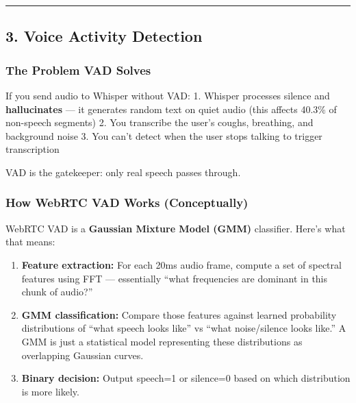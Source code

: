 \documentclass[
  11pt,
]{article}
\begin{document}
\begin{center}\rule{0.5\linewidth}{0.5pt}\end{center}

\hypertarget{voice-activity-detection}{%
\subsection{3. Voice Activity
Detection}\label{voice-activity-detection}}

\hypertarget{the-problem-vad-solves}{%
\subsubsection{The Problem VAD Solves}\label{the-problem-vad-solves}}

If you send audio to Whisper without VAD: 1. Whisper processes silence
and \textbf{hallucinates} --- it generates random text on quiet audio
(this affects 40.3\% of non-speech segments) 2. You transcribe the
user's coughs, breathing, and background noise 3. You can't detect when
the user stops talking to trigger transcription

VAD is the gatekeeper: only real speech passes through.

\hypertarget{how-webrtc-vad-works-conceptually}{%
\subsubsection{How WebRTC VAD Works
(Conceptually)}\label{how-webrtc-vad-works-conceptually}}

WebRTC VAD is a \textbf{Gaussian Mixture Model (GMM)} classifier. Here's
what that means:

\begin{enumerate}
\def\labelenumi{\arabic{enumi}.}
\item
  \textbf{Feature extraction:} For each 20ms audio frame, compute a set
  of spectral features using FFT --- essentially ``what frequencies are
  dominant in this chunk of audio?''
\item
  \textbf{GMM classification:} Compare those features against learned
  probability distributions of ``what speech looks like'' vs ``what
  noise/silence looks like.'' A GMM is just a statistical model
  representing these distributions as overlapping Gaussian curves.
\item
  \textbf{Binary decision:} Output speech=1 or silence=0 based on which
  distribution is more likely.
\end{enumerate}
\end{document}
